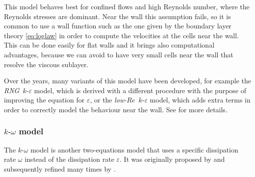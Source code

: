 This model behaves best for confined flows and high Reynolds number, where 
the Reynolds stresses are dominant. Near the wall this assumption fails, so it 
is common to use a wall function such as the one given by the boundary layer 
theory \eqref{eq:loglaw} in order to compute the velocities at the cells near 
the wall. This can be done easily for flat walls and it brings also 
computational advantages, because we can avoid to have very small cells near 
the wall that resolve the viscous sublayer.

Over the years, many variants of this model have been developed, for example 
the \emph{RNG}~$k\text{-}\varepsilon$ model, which is derived with a different 
procedure with the purpose of improving the equation for
$\varepsilon$, or the \emph{low-$Re$}~$k\text{-}\varepsilon$ model, which 
adds extra terms in order to correctly model the behaviour near the wall. See 
\cite{main:vermal} for more details.
%
\subsubsection{$k\text{-}\omega$ model}
The $k\text{-}\omega$ model is another two-equations model that uses a specific 
dissipation rate $\omega$ instead of the dissipation rate $\varepsilon$. It was 
originally proposed by \textcite{komega:kolmo} and subsequently refined many 
times by \textcite{turbo:komega}.

